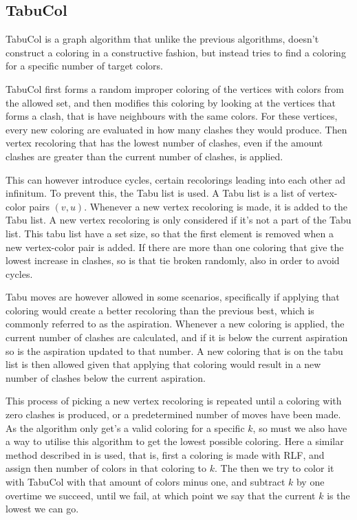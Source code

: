 \documentclass[a4paper]{article}
\begin{document}
\subsection{TabuCol}

TabuCol is a graph algorithm that unlike the previous algorithms, doesn't
construct a coloring in a constructive fashion, but instead tries to find a
coloring for a specific number of target colors.

TabuCol first forms a random improper coloring of the vertices with colors from
the allowed set, and then modifies this coloring by looking at the vertices that
forms a clash, that is have neighbours with the same colors. For these vertices,
every new coloring are evaluated in how many clashes they would produce. Then
vertex recoloring that has the lowest number of clashes, even if the amount
clashes are greater than the current number of clashes, is applied.

This can however introduce cycles, certain recolorings leading into each other
ad infinitum. To prevent this, the Tabu list is used. A Tabu list is a list of
vertex-color pairs $(v,u)$. Whenever a new vertex recoloring is made, it is
added to the Tabu list. A new vertex recoloring is only considered if it's not a
part of the Tabu list. This tabu list have a set size, so that the first element
is removed when a new vertex-color pair is added. If there are more than one
coloring that give the lowest increase in clashes, so is that tie broken
randomly, also in order to avoid cycles.

Tabu moves are however allowed in some scenarios, specifically if applying that
coloring would create a better recoloring than the previous best, which is
commonly referred to as the aspiration. Whenever a new coloring is applied, the
current number of clashes are calculated, and if it is below the current
aspiration so is the aspiration updated to that number.  A new coloring that is
on the tabu list is then allowed given that applying that coloring would result
in a new number of clashes below the current aspiration.

This process of picking a new vertex recoloring is repeated until a coloring
with zero clashes is produced, or a predetermined number of moves have been
made. As the algorithm only get's a valid coloring for a specific $k$, so must
we also have a way to utilise this algorithm to get the lowest possible
coloring.  Here a similar method described in \cite{Constructive} is used, that
is, first a coloring is made with RLF, and assign then number of colors in that
coloring to $k$.  The then we try to color it with TabuCol with that amount of
colors minus one, and subtract $k$ by one overtime we succeed, until we fail, at
which point we say that the current $k$ is the lowest we can go.
\end{document}
